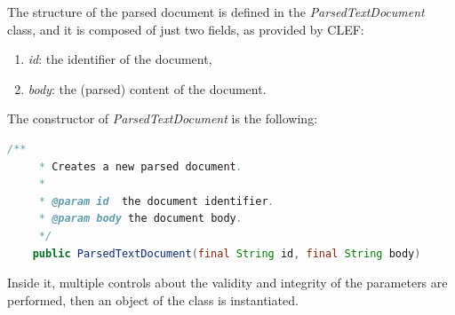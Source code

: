 The structure of the parsed document is defined in the \textit{ParsedTextDocument} class, and it is composed of just two fields, as provided by \ac{CLEF}:
\begin{enumerate}
\item \textit{id}: the identifier of the document,
\item \textit{body}: the (parsed) content of the document.
\end{enumerate}
The constructor of \textit{ParsedTextDocument} is the following:
\begin{lstlisting}[language=Java]
    /**
     * Creates a new parsed document.
     *
     * @param id  the document identifier.
     * @param body the document body.
     */
    public ParsedTextDocument(final String id, final String body) 
\end{lstlisting}
Inside it, multiple controls about the validity and integrity of the parameters are performed, then an object of the class is instantiated. 


